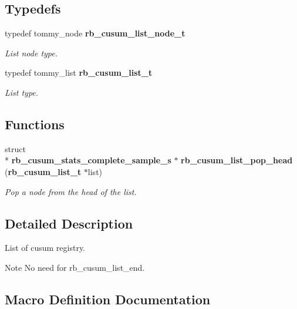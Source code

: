 \subsection*{Typedefs}
\begin{DoxyCompactItemize}
\item 
typedef tommy\+\_\+node {\bf rb\+\_\+cusum\+\_\+list\+\_\+node\+\_\+t}
\begin{DoxyCompactList}\small\item\em List node type. \end{DoxyCompactList}\item 
typedef tommy\+\_\+list {\bf rb\+\_\+cusum\+\_\+list\+\_\+t}
\begin{DoxyCompactList}\small\item\em List type. \end{DoxyCompactList}\end{DoxyCompactItemize}
\subsection*{Functions}
\begin{DoxyCompactItemize}
\item 
struct \\*
{\bf rb\+\_\+cusum\+\_\+stats\+\_\+complete\+\_\+sample\+\_\+s} $\ast$ {\bf rb\+\_\+cusum\+\_\+list\+\_\+pop\+\_\+head} ({\bf rb\+\_\+cusum\+\_\+list\+\_\+t} $\ast$list)
\begin{DoxyCompactList}\small\item\em Pop a node from the head of the list. \end{DoxyCompactList}\end{DoxyCompactItemize}


\subsection{Detailed Description}
List of cusum registry. 

\begin{DoxyNote}{Note}
No need for rb\+\_\+cusum\+\_\+list\+\_\+end. 
\end{DoxyNote}


\subsection{Macro Definition Documentation}
